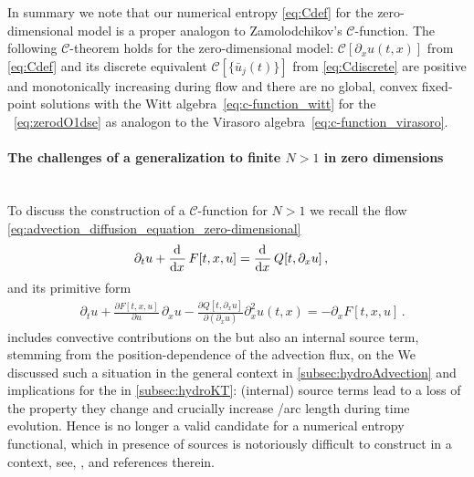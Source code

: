 In summary we note that our numerical entropy \eqref{eq:Cdef} for the zero-dimensional  model is a proper analogon to  Zamolodchikov's $\mathcal{C}$-function. The following $\mathcal{C}$-theorem holds for the zero-dimensional  model: $\mathcal{C} [ \partial_x u ( t, x ) ]$ from \cref{eq:Cdef} and its discrete \fv{} equivalent $\mathcal{C} [ \{\bar{u}_j(t)\}]$ from \cref{eq:Cdiscrete} are positive and monotonically increasing during \frg{} flow and there are no global, convex fixed-point solutions with the Witt algebra~\eqref{eq:c-function_witt} for the \dses{}~\eqref{eq:zerodO1dse} as analogon to the Virasoro algebra~\eqref{eq:c-function_virasoro}.

\paragraph{The challenges of a generalization to finite $N>1$ in zero dimensions}\label{paragraph:cTheoremzerodON}\mbox{}\\%
To discuss the construction of a $\mathcal{C}$-function for $N>1$ we recall the \frg{} flow \cref{eq:advection_diffusion_equation_zero-dimensional} 
\begin{align}
	&\partial_t u + \dod{}{x} F [ t, x, u ] = \dod{}{x} Q [ t, \partial_x u ]\, ,
\end{align}
and its primitive form
\vspace{-.05em}
\begin{align}
&\partial_t u + \frac{\partial F [ t, x, u ]}{\partial u}  \, \partial_x u - \frac{\partial Q [ t, \partial_x u ]}{\partial(\partial_x u)} \partial_x^2 u ( t, x ) = -\partial_x F [ t, x, u ]\,.\label{eq:zerodO1primitive}
\end{align}
\vspace{-.05em}
 includes convective contributions on the \lhs{} but also an internal source term, stemming from the position-dependence of the advection flux, on the \rhs{}
We discussed such a situation in the general \cfd{} context in \cref{subsec:hydroAdvection} and implications for the \tv{} in \cref{subsec:hydroKT}: (internal) source terms lead to a loss of the \tvni{} property \dash{} they change and crucially increase \tv{}/arc length during time evolution.
Hence \tv{} is no longer a valid candidate for a numerical entropy functional, which in presence of sources is notoriously difficult to construct in a \cfd{} context, see, \eg{},  and references therein. 

